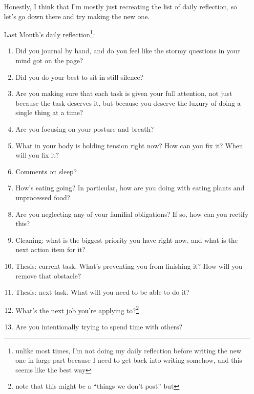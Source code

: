 \documentclass[12pt]{article}
\newcommand{\say}[1]{``#1''}
\renewcommand{\,}{\textsuperscript{,}}
\begin{document}
Honestly, I think that I'm mostly just recreating the list of daily reflection, so let's go down there and try making the new one.

Last Month's daily reflection\footnote{unlike most times, I'm not doing my daily reflection before writing the new one in large part because I need to get back into writing somehow, and this seems like the best way}:

\begin{enumerate}

\item Did you journal by hand, and do you feel like the stormy questions in your mind got on the page?

\item Did you do your best to sit in still silence?

\item Are you making sure that each task is given your full attention, not just because the task deserves it, but because you deserve the luxury of doing a single thing at a time?

\item Are you focusing on your posture and breath?

\item What in your body is holding tension right now? How can you fix it? When will you fix it?

\item Comments on sleep?

\item How's eating going? In particular, how are you doing with eating plants and unprocessed food?

\item Are you neglecting any of your familial obligations? If so, how can you rectify this?

\item Cleaning: what is the biggest priority you have right now, and what is the next action item for it?

\item Thesis: current task. What's preventing you from finishing it? How will you remove that obstacle?

\item Thesis: next task. What will you need to be able to do it?

\item What's the next job you're applying to?\footnote{note that this might be a \say{things we don't post} but}

\item Are you intentionally trying to spend time with others?


\end{enumerate}
\end{document}
